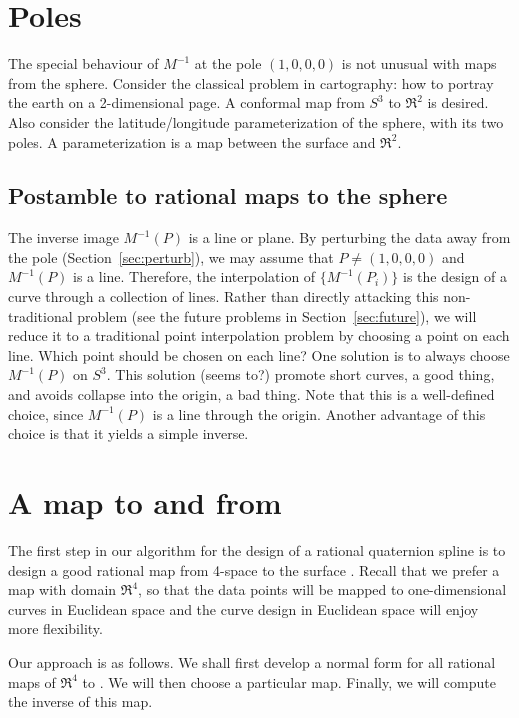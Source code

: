 \documentclass[11pt]{article}
\begin{document}
\section{Poles}

The special behaviour of $M^{-1}$ at the pole $(1,0,0,0)$
is not unusual with maps from the sphere.
Consider the classical problem in cartography: how to portray the earth
on a 2-dimensional page.
A conformal map from $S^3$ to $\Re^2$ is desired.
Also consider the latitude/longitude parameterization of the sphere, with its two poles.
A parameterization is a map between the surface and $\Re^2$.

\subsection{Postamble to rational maps to the sphere}

The inverse image $M^{-1}(P)$ is a line or plane.
By perturbing the data away from the pole (Section~\ref{sec:perturb}), 
we may assume that $P \neq (1,0,0,0)$ and $M^{-1}(P)$ is a line.
Therefore, the interpolation of $\{M^{-1}(P_i)\}$ is the design of a curve through a
collection of lines.
Rather than directly attacking this non-traditional problem (see the future problems in
Section~\ref{sec:future}), we will reduce it to a traditional point
interpolation problem by choosing a point on each line.
Which point should be chosen on each line?
One solution is to always choose $M^{-1}(P)$ on $S^3$.
This solution (seems to?) promote short curves, a good thing, 
and avoids collapse into the origin, a bad thing.
Note that this is a well-defined choice, since $M^{-1}(P)$ is a line through the origin.
Another advantage of this choice is that it yields a simple inverse.


\section{A map to and from }
\label{sec:map}

The first step in our algorithm for the design of a rational quaternion
spline is to design a good rational map from 4-space to the surface .
Recall that we prefer a map with domain $\Re^4$, so that the data points will be
mapped to one-dimensional curves in Euclidean space and the 
curve design in Euclidean space will enjoy more flexibility.

Our approach is as follows.
We shall first develop a normal form for all rational maps of $\Re^4$ to .
We will then choose a particular map.
Finally, we will compute the inverse of this map.
\end{document}
